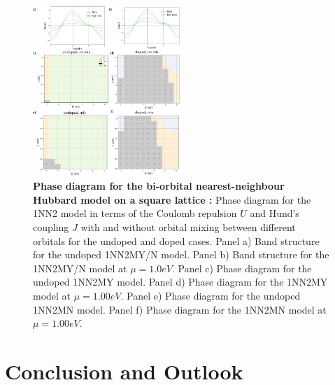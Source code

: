 \documentclass[11pt]{article}
\begin{document}
\begin{figure}[htbp]  %
    \centering
    \includegraphics[width=0.50\textwidth]{1NN2.png}  %
    \caption{\textbf{Phase diagram for the bi-orbital nearest-neighbour Hubbard model on a square lattice :} Phase diagram for the 1NN2 model in terms of 
    the Coulomb repulsion $U$ and Hund's coupling $J$ with and without orbital 
    mixing between different orbitals for the undoped and doped cases. Panel a) Band structure for the undoped 1NN2MY/N model. 
    Panel b) Band structure for the 1NN2MY/N model at $\mu =1.0eV$. 
    Panel c) Phase diagram for the undoped 1NN2MY model.
    Panel d) Phase diagram for the 1NN2MY model at $\mu =1.00eV$.
    Panel e) Phase diagram for the undoped 1NN2MN model.
    Panel f) Phase diagram for the 1NN2MN model at $\mu =1.00eV$.}
    \label{fig:1NN2pd}
\end{figure}
\section{Conclusion and Outlook}
\end{document}
